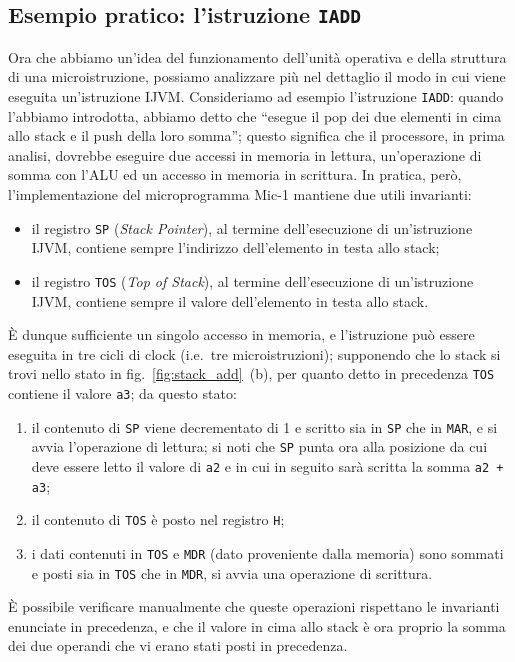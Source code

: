 \documentclass[a4paper,12pt]{scrreprt}
\begin{document}
\subsection{Esempio pratico: l'istruzione \lstinline{IADD}}

Ora che abbiamo un'idea del funzionamento dell'unità operativa e della struttura
di una microistruzione, possiamo analizzare più nel dettaglio il modo in cui
viene eseguita un'istruzione IJVM. Consideriamo ad esempio l'istruzione
\lstinline{IADD}: quando l'abbiamo introdotta, abbiamo detto che ``esegue il pop
dei due elementi in cima allo stack e il push della loro somma''; questo
significa che il processore, in prima analisi, dovrebbe eseguire due accessi in
memoria in lettura, un'operazione di somma con l'ALU ed un accesso in memoria in
scrittura. In pratica, però, l'implementazione del microprogramma Mic-1 mantiene
due utili invarianti:
\begin{itemize}
  \item il registro \lstinline{SP} (\textit{Stack Pointer}), al termine dell'esecuzione
  di un'istruzione IJVM, contiene sempre l'indirizzo dell'elemento in testa allo
  stack;
  \item il registro \lstinline{TOS} (\textit{Top of Stack}), al termine dell'esecuzione
  di un'istruzione IJVM, contiene sempre il valore dell'elemento in testa allo
  stack.
\end{itemize}

È dunque sufficiente un singolo accesso in memoria, e l'istruzione può essere
eseguita in tre cicli di clock (i.e.~tre microistruzioni); supponendo che lo
stack si trovi nello stato in fig.~\ref{fig:stack_add}~(b), per quanto detto in
precedenza \lstinline{TOS} contiene il valore \lstinline{a3}; da questo stato:
\begin{enumerate}
  \item il contenuto di \lstinline{SP} viene decrementato di 1 e scritto sia in
  \lstinline{SP} che in \lstinline{MAR}, e si avvia l'operazione di lettura; si
  noti che \lstinline{SP} punta ora alla posizione da cui deve essere letto il
  valore di \lstinline{a2} e in cui in seguito sarà scritta la somma
  \lstinline{a2 + a3};
  \item il contenuto di \lstinline{TOS} è posto nel registro \lstinline{H};
  \item i dati contenuti in \lstinline{TOS} e \lstinline{MDR} (dato proveniente
  dalla memoria) sono sommati e posti sia in \lstinline{TOS} che in
  \lstinline{MDR}, si avvia una operazione di scrittura.
\end{enumerate}
È possibile verificare manualmente che queste operazioni rispettano le
invarianti enunciate in precedenza, e che il valore in cima allo stack è ora
proprio la somma dei due operandi che vi erano stati posti in precedenza.
\end{document}
